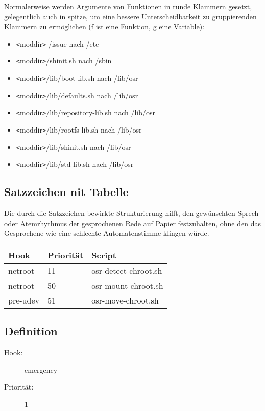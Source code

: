 \documentclass[10pt,a4paper]{article}
\begin{document}
Normalerweise werden Argumente von Funktionen in runde Klammern gesetzt,
gelegentlich auch in spitze, um eine bessere Unterscheidbarkeit zu
gruppierenden Klammern zu ermöglichen (f ist eine Funktion, g eine Variable):

\begin{itemize}
 \item \verb|<|moddir\verb|>| /issue nach /etc
 \item \verb|<|moddir\verb|>|/shinit.sh nach /sbin
 \item \verb|<|moddir\verb|>|/lib/boot-lib.sh nach /lib/osr
 \item \verb|<|moddir\verb|>|/lib/defaults.sh nach /lib/osr
 \item \verb|<|moddir\verb|>|/lib/repository-lib.sh nach /lib/osr
 \item \verb|<|moddir\verb|>|/lib/rootfs-lib.sh nach /lib/osr
 \item \verb|<|moddir\verb|>|/lib/shinit.sh nach /lib/osr
 \item \verb|<|moddir\verb|>|/lib/std-lib.sh nach /lib/osr
\end{itemize}

\subsection{Satzzeichen nit Tabelle}

Die durch die Satzzeichen bewirkte Strukturierung hilft, den gewünschten
Sprech- oder Atemrhythmus der gesprochenen Rede auf Papier festzuhalten,
ohne den das Gesprochene wie eine schlechte Automatenstimme klingen würde.

\begin{tabular}{|l|l|l|}
 \hline
\textbf{Hook} & \textbf{Priorität} & \textbf{Script} \\ \hline
netroot  & 11 & osr-detect-chroot.sh \\ \hline
netroot  & 50 & osr-mount-chroot.sh \\ \hline
pre-udev & 51 & osr-move-chroot.sh \\ \hline
\end{tabular}

\subsection{Definition}


\begin{description}
\item[Hook:] emergency
\item[Priorität:] 1
\end{description}
\end{document}
